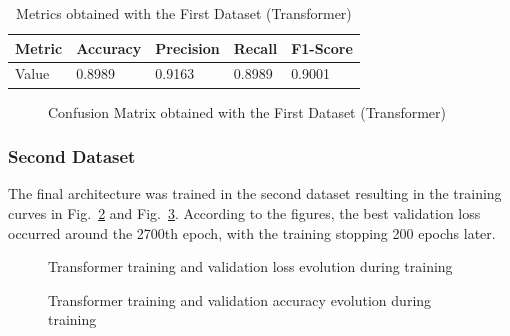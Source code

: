 \begin{table}[H]
    \centering
    \caption{Metrics obtained with the First Dataset (Transformer)}
    \label{table:transformer_dataset1_results}
    \begin{tabular}{|l|l|l|l|l|}
        \hline
        Metric & Accuracy & Precision & Recall & F1-Score \\
        \hline
        Value & 0.8989 & 0.9163 & 0.8989 & 0.9001 \\
        \hline
    \end{tabular}
\end{table}

\begin{figure}[H]
    \centering
    {\fontsize{10}{12}\selectfont}
    \caption[Confusion Matrix obtained with the First Dataset (Transformer)]{Confusion Matrix obtained with the First Dataset (Transformer)}
    \label{fig:transformer_dataset1_confusion_matrix}
\end{figure}

\subsubsection{Second Dataset}

The final architecture was trained in the second dataset resulting in the training curves in Fig.~\ref{fig:transformer_loss} and Fig.~\ref{fig:transformer_acc}. According to the figures, the best validation loss occurred around the 2700th epoch, with the training stopping 200 epochs later.

\begin{figure}[H]
    \centering
    {\fontsize{10}{12}\selectfont}
    \caption[Transformer training and validation loss evolution during training]{Transformer training and validation loss evolution during training}
    \label{fig:transformer_loss}
\end{figure}

\begin{figure}[H]
    \centering
    {\fontsize{10}{12}\selectfont}
    \caption[Transformer training and validation accuracy evolution during training]{Transformer training and validation accuracy evolution during training}
    \label{fig:transformer_acc}
\end{figure}

